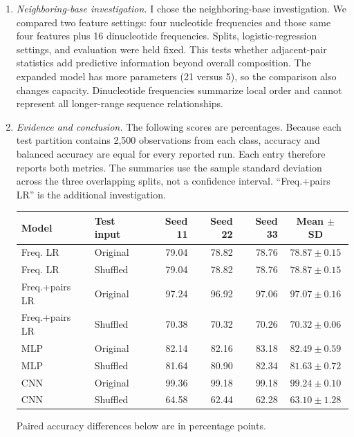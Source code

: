 \documentclass[12pt]{article}
\begin{document}
\begin{enumerate}
\begin{enumerate}[label=\textbf{\Alph*.}, leftmargin=*]
       \item \emph{Neighboring-base investigation.}
       I chose the neighboring-base investigation. We compared two
       feature settings: four nucleotide frequencies and
       those same four features plus 16 dinucleotide frequencies. Splits,
       logistic-regression settings, and evaluation were held fixed.
       This tests whether adjacent-pair statistics add predictive
       information beyond overall composition. The expanded model has
       more parameters (21 versus 5), so the comparison also changes
       capacity. Dinucleotide frequencies summarize local order and
       cannot represent all longer-range sequence relationships.
       \item \emph{Evidence and conclusion.}
       The following scores are percentages. Because each test partition
       contains 2,500 observations from each class, accuracy and balanced
       accuracy are equal for every reported run. Each entry therefore
       reports both metrics. The summaries use the sample standard
       deviation across the three overlapping splits, not a confidence
       interval. ``Freq.+pairs LR'' is the additional investigation.
       \begin{center}
       {\small
       \begin{tabular}{l l r r r c}
           \toprule
           Model & Test input & Seed 11 & Seed 22 & Seed 33 & Mean $\pm$ SD \\
           \midrule
           Freq. LR & Original & 79.04 & 78.82 & 78.76 & $78.87\pm0.15$ \\
           Freq. LR & Shuffled & 79.04 & 78.82 & 78.76 & $78.87\pm0.15$ \\
           Freq.+pairs LR & Original & 97.24 & 96.92 & 97.06 & $97.07\pm0.16$ \\
           Freq.+pairs LR & Shuffled & 70.38 & 70.32 & 70.26 & $70.32\pm0.06$ \\
           MLP & Original & 82.14 & 82.16 & 83.18 & $82.49\pm0.59$ \\
           MLP & Shuffled & 81.64 & 80.90 & 82.34 & $81.63\pm0.72$ \\
           CNN & Original & 99.36 & 99.18 & 99.18 & $99.24\pm0.10$ \\
           CNN & Shuffled & 64.58 & 62.44 & 62.28 & $63.10\pm1.28$ \\
           \bottomrule
       \end{tabular}}
       \end{center}
       Paired accuracy differences below are in percentage points.

\end{enumerate}
\end{enumerate}
\end{document}
